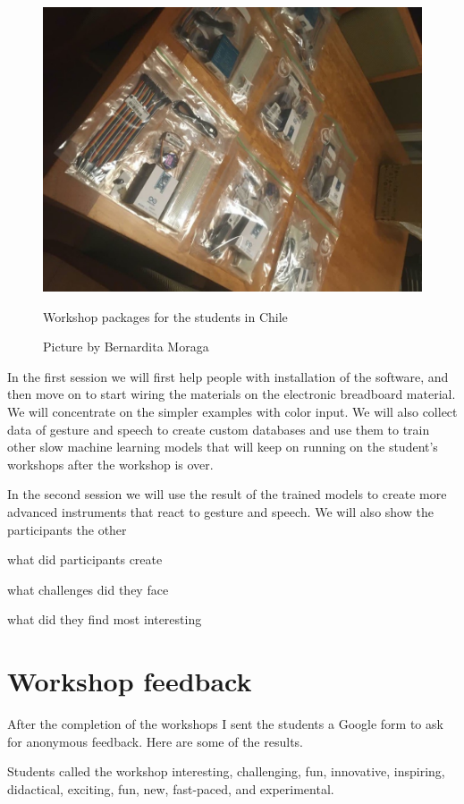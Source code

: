 \begin{figure}[ht]
  \centering
  \includegraphics[width=0.75\linewidth,height=0.25\textheight,keepaspectratio]{images/workshop-packages-chile.jpg}
  \caption{Workshop packages for the students in Chile}
  \caption*{Picture by Bernardita Moraga}
  \label{fig:workshop-packages-chile}
\end{figure}

In the first session we will first help people with installation of the software, and then move on to start wiring the materials on the electronic breadboard material. We will concentrate on the simpler examples with color input. We will also collect data of gesture and speech to create custom databases and use them to train other slow machine learning models that will keep on running on the student's workshops after the workshop is over.

In the second session we will use the result of the trained models to create more advanced instruments that react to gesture and speech. We will also show the participants the other 


what did participants create

what challenges did they face

what did they find most interesting

\section{Workshop feedback}

After the completion of the workshops I sent the students a Google form to ask for anonymous feedback. Here are some of the results.

Students called the workshop interesting, challenging, fun, innovative, inspiring, didactical, exciting, fun, new, fast-paced, and experimental.


